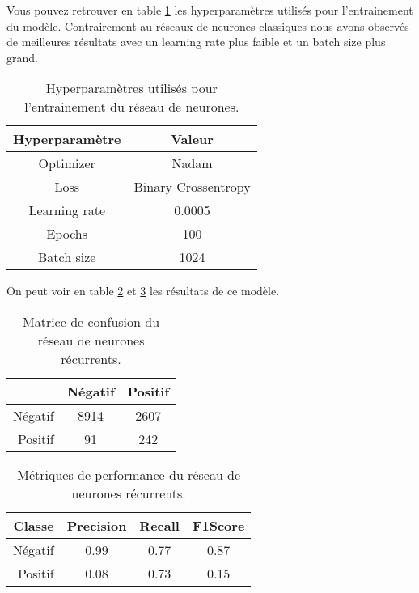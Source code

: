 Vous pouvez retrouver en table \ref{rnn_hyperparameters} les hyperparamètres utilisés pour l'entrainement du modèle.
Contrairement au réseaux de neurones classiques nous avons observés de meilleures résultats avec un learning rate plus faible et un batch size plus grand.
\begin{table}[H]
    \begin{center}
        \begin{tabular}{|c|c|}
            Hyperparamètre & Valeur              \\
            \hline
            Optimizer      & Nadam               \\
            Loss           & Binary Crossentropy \\
            Learning rate  & 0.0005              \\
            Epochs         & 100                 \\
            Batch size     & 1024                \\
        \end{tabular}
    \end{center}
    \caption{Hyperparamètres utilisés pour l'entrainement du réseau de neurones.}
    \label{rnn_hyperparameters}
\end{table}

On peut voir en table \ref{rnn_matrix} et \ref{rnn_results} les résultats de ce modèle.
\begin{table}[H]
    \begin{center}
        \caption{\label{rnn_matrix}Matrice de confusion du réseau de neurones récurrents.}
        \begin{tabular}{r|cc}
                    & Négatif & Positif \\ \hline
            Négatif & 8914    & 2607    \\
            Positif & 91      & 242     \\
        \end{tabular}
    \end{center}
\end{table}

\begin{table}[H]
    \begin{center}
        \caption{\label{rnn_results}Métriques de performance du réseau de neurones récurrents.}
        \begin{tabular}{r|ccc}
            Classe  & Precision & Recall & F1Score \\ \hline
            Négatif & 0.99      & 0.77   & 0.87    \\
            Positif & 0.08      & 0.73   & 0.15    \\
        \end{tabular}
    \end{center}
\end{table}

